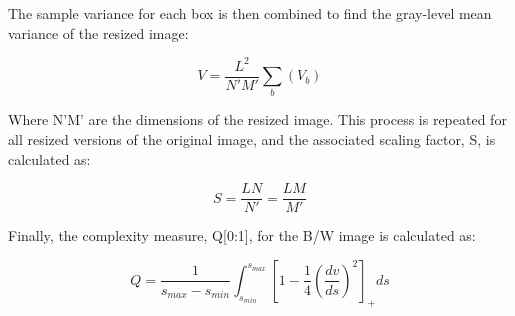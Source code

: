 \documentclass[12pt]{article}
\begin{document}
The sample variance for each box is then combined to find the gray-level mean variance of the resized image:

\begin{equation}
	V = \frac{L^2}{N'M'}\sum_{b}(V_b)
	\label{eq:Q3}
\end{equation} 

Where N'M' are the dimensions of the resized image. This process is repeated for all resized versions of the original image, and the associated scaling factor, S, is calculated as:

\begin{equation}
	S = \frac{LN}{N'} = \frac{LM}{M'}
	\label{eq:Q4}
\end{equation} 

Finally, the complexity measure, Q[0:1], for the B/W image is calculated as: 

\begin{equation}
	Q = \frac{1}{s_{max}-s_{min}}\int_{s_{min}}^{s_{max}} \left[1-\frac{1}{4} \left(\frac{dv}{ds}\right)^2 \right]_+ds
	\label{eq:Q5}
\end{equation} 
\end{document}
